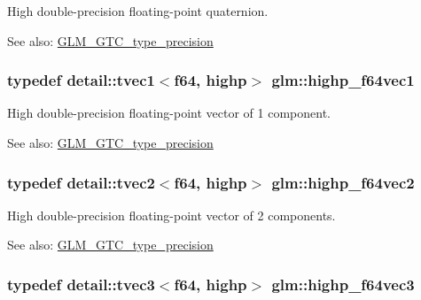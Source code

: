 High double-precision floating-point quaternion. \begin{Desc}
\item[See also:]\hyperlink{group__gtc__type__precision}{GLM\_\-GTC\_\-type\_\-precision} \end{Desc}
\hypertarget{group__gtc__type__precision_g1054b4e4da2b907b35e1806bd6fbaef1}{
\subsubsection[highp\_\-f64vec1]{\setlength{\rightskip}{0pt plus 5cm}typedef detail::tvec1$<$f64, highp$>$ {\bf glm::highp\_\-f64vec1}}}
\label{group__gtc__type__precision_g1054b4e4da2b907b35e1806bd6fbaef1}


High double-precision floating-point vector of 1 component. \begin{Desc}
\item[See also:]\hyperlink{group__gtc__type__precision}{GLM\_\-GTC\_\-type\_\-precision} \end{Desc}
\hypertarget{group__gtc__type__precision_g1efd4982eaeafae59ce40deb89e018e7}{
\subsubsection[highp\_\-f64vec2]{\setlength{\rightskip}{0pt plus 5cm}typedef detail::tvec2$<$f64, highp$>$ {\bf glm::highp\_\-f64vec2}}}
\label{group__gtc__type__precision_g1efd4982eaeafae59ce40deb89e018e7}


High double-precision floating-point vector of 2 components. \begin{Desc}
\item[See also:]\hyperlink{group__gtc__type__precision}{GLM\_\-GTC\_\-type\_\-precision} \end{Desc}
\hypertarget{group__gtc__type__precision_g93cbac95bb9106fe15c987c0f56ae679}{
\subsubsection[highp\_\-f64vec3]{\setlength{\rightskip}{0pt plus 5cm}typedef detail::tvec3$<$f64, highp$>$ {\bf glm::highp\_\-f64vec3}}}
\label{group__gtc__type__precision_g93cbac95bb9106fe15c987c0f56ae679}


